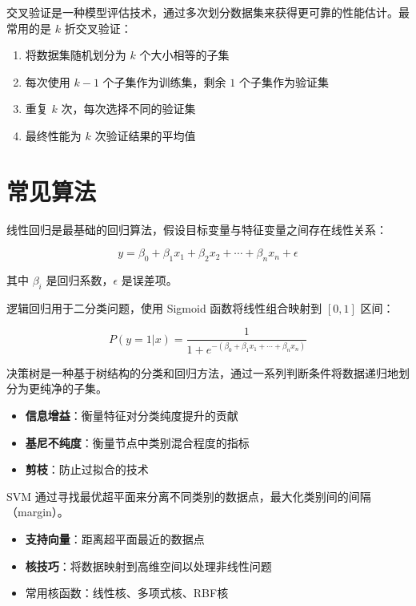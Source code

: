 \begin{definition}[交叉验证]
    交叉验证是一种模型评估技术，通过多次划分数据集来获得更可靠的性能估计。最常用的是 $k$ 折交叉验证：
    \begin{enumerate}
        \item 将数据集随机划分为 $k$ 个大小相等的子集
        \item 每次使用 $k-1$ 个子集作为训练集，剩余 $1$ 个子集作为验证集
        \item 重复 $k$ 次，每次选择不同的验证集
        \item 最终性能为 $k$ 次验证结果的平均值
    \end{enumerate}
\end{definition}

\section{常见算法}

\begin{definition}[线性回归]
    线性回归是最基础的回归算法，假设目标变量与特征变量之间存在线性关系：

    $$y = \beta_0 + \beta_1 x_1 + \beta_2 x_2 + \cdots + \beta_n x_n + \epsilon$$

    其中 $\beta_i$ 是回归系数，$\epsilon$ 是误差项。
\end{definition}

\begin{definition}[逻辑回归]
    逻辑回归用于二分类问题，使用 Sigmoid 函数将线性组合映射到 $[0,1]$ 区间：

    $$P(y=1|x) = \frac{1}{1 + e^{-(\beta_0 + \beta_1 x_1 + \cdots + \beta_n x_n)}}$$
\end{definition}

\begin{definition}[决策树]
    决策树是一种基于树结构的分类和回归方法，通过一系列判断条件将数据递归地划分为更纯净的子集。
    \begin{itemize}
        \item \textbf{信息增益}：衡量特征对分类纯度提升的贡献
        \item \textbf{基尼不纯度}：衡量节点中类别混合程度的指标
        \item \textbf{剪枝}：防止过拟合的技术
    \end{itemize}
\end{definition}

\begin{definition}
    SVM 通过寻找最优超平面来分离不同类别的数据点，最大化类别间的间隔（margin）。
    \begin{itemize}
        \item \textbf{支持向量}：距离超平面最近的数据点
        \item \textbf{核技巧}：将数据映射到高维空间以处理非线性问题
        \item 常用核函数：线性核、多项式核、RBF核
    \end{itemize}
\end{definition}


